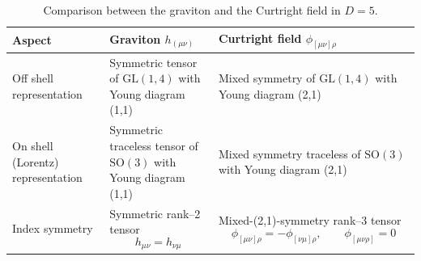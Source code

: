 \documentclass[a4paper,12pt]{article}
\begin{document}
\begin{longtable}{|p{3.2cm}|p{4.4cm}|p{6.2cm}|}
\caption{Comparison between the graviton and the Curtright field in \( D=5 \).}
\endfirsthead
\hline
\textbf{Aspect} & \textbf{Graviton $h_{(\mu \nu)}$} & \textbf{Curtright field $\phi_{[\mu \nu]\rho}$} \\
\hline
Off shell representation & Symmetric tensor of \( \mathrm{GL}(1,4) \) with Young diagram (1,1)
&  Mixed symmetry of \( \mathrm{GL}(1,4) \) with Young diagram (2,1)\\
\hline
On shell (Lorentz) representation & Symmetric traceless tensor of \( \mathrm{SO}(3) \) with Young diagram (1,1)
&  Mixed symmetry traceless of \( \mathrm{SO}(3) \) with Young diagram (2,1)\\
\hline
Index symmetry &  Symmetric rank--2 tensor
\[
h_{\mu \nu}=h_{\nu \mu}
\]
&  Mixed-(2,1)-symmetry rank--3 tensor
\[
\phi_{[\mu \nu]\rho}=-\phi_{[\nu \mu]\rho}, \qquad
\phi_{[\mu \nu \rho]}=0
\]\\
\hline


\end{longtable}
\end{document}
